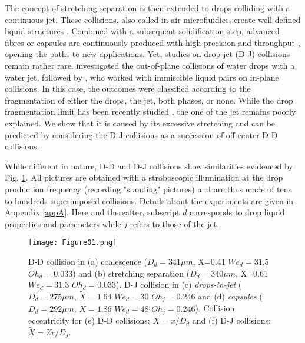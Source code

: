 \documentclass{article}
\begin{document}
{The concept of stretching separation is then extended to drops colliding with a continuous jet. These collisions, also called in-air microfluidics, create well-defined liquid structures \citep{ref:Baumgartner2019_ILASS}. Combined with a subsequent solidification step,  advanced  fibres  or  capsules are continuously produced with high precision and throughput \citep{ref:Visser2018}, opening the paths to new applications.} Yet, studies on drop-jet (D-J) collisions remain rather rare. \cite{ref:Chen2006} investigated the {out-of-plane} collisions of water drops with a water jet, followed by \cite{ref:Planchette2018}, who {worked  with immiscible liquid pairs on in-plane collisions}. In this case, the outcomes were classified according to the fragmentation of either the drops, the jet, both phases, or none. {While the drop fragmentation limit has been recently studied \citep{ref:Baumgartner2020, ref:Baumgartner2020_PRF}, the one of the jet remains poorly explained. We show that it is caused by its excessive  stretching and  can be  predicted by considering the D-J collisions  as a succession of off-center D-D collisions.}


While  different in nature, D-D and D-J collisions show similarities evidenced by Fig. \ref{fig01}.  {All pictures are obtained with a stroboscopic illumination at the drop production frequency (recording "standing" pictures) and are thus  made of tens to hundreds superimposed collisions.} Details about the experiments are given in Appendix \ref{appA}. Here and thereafter, subscript $d$ corresponds to drop liquid properties and  parameters while $j$ refers to those of the jet.

\begin{figure}
\texttt{[image: Figure01.png]}
\centering
\caption{\label{fig01} D-D collision in (a) coalescence ({$D_d=341 \mu m$}, X=0.41 $We_d=31.5$ $Oh_d=0.033$) and (b) stretching separation ({$D_d=340 \mu m$}, X=0.61 $We_d=31.3$ $Oh_d=0.033$). D-J collision in (c)  \textit{drops-in-jet}  ({$D_d=275 \mu m$}, $\tilde{X}=1.64$ $We_{d}=30$ $Oh_j=0.246$ and (d) \textit{capsules} ({$D_d=292 \mu m$}, $\tilde{X}=1.86$ $We_{d}=48$ $Oh_j=0.246$). Collision eccentricity for (e) D-D collisions: $X=x/D_d$ and (f) D-J collisions: $\tilde{X}=2\tilde{x}/D_j$.}
\end{figure}
\end{document}
